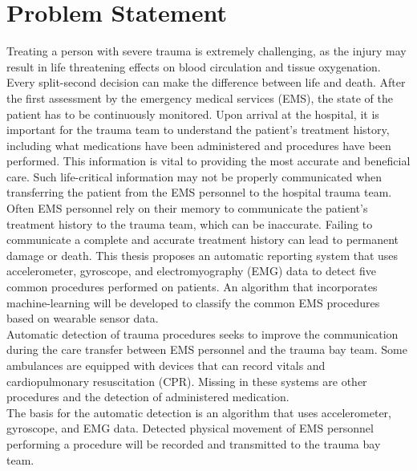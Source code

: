 
\chapter{Problem Statement}
\label{ch:Problem-Statement}

Treating a person with severe trauma is extremely challenging, as the injury may result in life threatening effects on blood circulation and tissue oxygenation. Every split-second decision can make the difference between life and death. After the first assessment by the emergency medical services (\gls{EMS}), the state of the patient has to be continuously monitored. Upon arrival at the hospital, it is important for the trauma team to understand the patient's treatment history, including what medications have been administered and procedures have been performed.  This information is vital to providing the most accurate and beneficial care. Such life-critical information may not be properly communicated when transferring the patient from the \gls{EMS} personnel to the hospital trauma team. Often \gls{EMS} personnel rely on their memory to communicate the patient's treatment history to the trauma team, which can be inaccurate. Failing to communicate a complete and accurate treatment history can lead to permanent damage or death. This thesis proposes an automatic reporting system that uses accelerometer, gyroscope, and electromyography (\gls{EMG}) data to detect five common procedures performed on patients. An algorithm that incorporates machine-learning will be developed to classify the common \gls{EMS} procedures based on wearable sensor data.\\
Automatic detection of trauma procedures seeks to improve the communication during the care transfer between EMS personnel and the trauma bay team. Some ambulances are equipped with devices that can record vitals and cardiopulmonary resuscitation (\gls{CPR}). Missing in these systems are other procedures and the detection of administered medication.\\
The basis for the automatic detection is an algorithm that uses accelerometer, gyroscope, and \gls{EMG} data. Detected physical movement of \gls{EMS} personnel performing a procedure will be recorded and transmitted to the trauma bay team.\\
